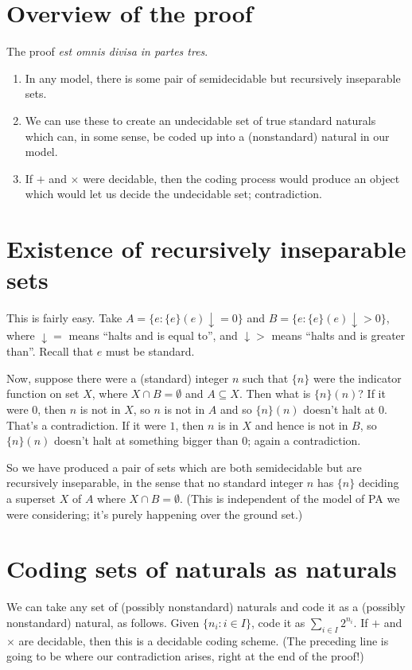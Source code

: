 \documentclass[11pt]{amsart}
\theoremstyle{remark}
\begin{document}
\section{Overview of the proof}

The proof \emph{est omnis divisa in partes tres}.

\begin{enumerate}
\item In any model, there is some pair of semidecidable but recursively inseparable sets.
\item We can use these to create an undecidable set of true standard naturals which can, in some sense, be coded up into a (nonstandard) natural in our model.
\item If $+$ and $\times$ were decidable, then the coding process would produce an object which would let us decide the undecidable set; contradiction.
\end{enumerate}

\section{Existence of recursively inseparable sets}
This is fairly easy. Take $A = \{ e : \{ e \}(e) \downarrow = 0 \}$ and $B = \{ e: \{e \}(e) \downarrow > 0 \}$, where $\downarrow=$ means ``halts and is equal to'', and $\downarrow >$ means ``halts and is greater than''.
Recall that $e$ must be standard.

Now, suppose there were a (standard) integer $n$ such that $\{ n \}$ were the indicator function on set $X$, where $X \cap B = \emptyset$ and $A \subseteq X$.
Then what is $\{n\}(n)$?
If it were $0$, then $n$ is not in $X$, so $n$ is not in $A$ and so $\{n\}(n)$ doesn't halt at $0$.
That's a contradiction.
If it were $1$, then $n$ is in $X$ and hence is not in $B$, so $\{n\}(n)$ doesn't halt at something bigger than $0$; again a contradiction.

So we have produced a pair of sets which are both semidecidable but are recursively inseparable, in the sense that no standard integer $n$ has $\{n\}$ deciding a superset $X$ of $A$ where $X \cap B = \emptyset$.
(This is independent of the model of PA we were considering; it's purely happening over the ground set.)

\section{Coding sets of naturals as naturals}
We can take any set of (possibly nonstandard) naturals and code it as a (possibly nonstandard) natural, as follows.
Given $\{ n_i : i \in I \}$, code it as $\sum_{i \in I} 2^{n_i}$.
If $+$ and $\times$ are decidable, then this is a decidable coding scheme.
(The preceding line is going to be where our contradiction arises, right at the end of the proof!)
\end{document}
